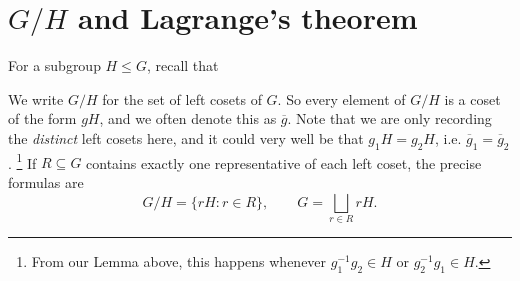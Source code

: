 \documentclass[reqno,11pt]{amsart}
\begin{document}
%
%
%


\section{$G/H$ and Lagrange's theorem}

For a subgroup $H \leq G$, recall that 

\begin{define} We write $G/H$ for the set of left cosets of $G$. So every element of $G/H$ is a coset of the form $gH$, and we often denote this as $\overline{g}$. Note that we are only recording the \textit{distinct} left cosets here, and it could very well be that $g_1H  =g_2H$, i.e. $\overline{g}_1 = \overline{g}_2$. \footnote{
		From our Lemma above, this happens whenever $g_1^{-1} g_2\in H$ or $g_2^{-1}g_1 \in H.$}
	If $R\subseteq G$ contains exactly one representative of each left coset,
	the precise formulas are
	\begin{equation}
		G/H=\{rH:r\in R\},\qquad G=\bigsqcup_{r\in R}rH.
	\end{equation}
	
	 \end{define} 
\end{document}
